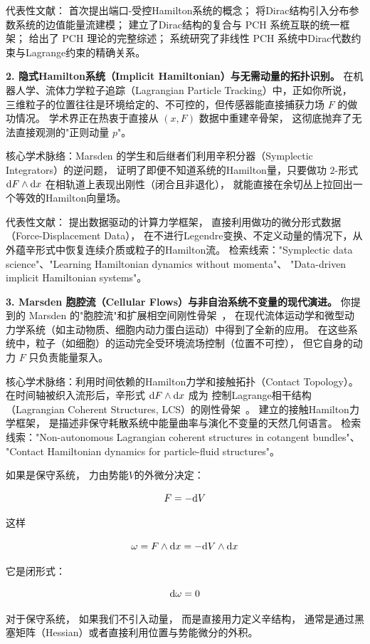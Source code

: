﻿\documentclass[10pt,a4paper]{article}
\begin{document}
\begin{framed}
代表性文献：\textcite{MaschkeVanDerSchaft1992} 首次提出端口-受控Hamilton系统的概念；
\textcite{VanDerSchaftMaschke2002} 将Dirac结构引入分布参数系统的边值能量流建模；
\textcite{CerveraVanDerSchaftBanos2007} 建立了Dirac结构的复合与 PCH 系统互联的统一框架；
\textcite{VanDerSchaftJeltsema2014} 给出了 PCH 理论的完整综述；
\textcite{VanDerSchaftMaschke2020} 系统研究了非线性 PCH 系统中Dirac代数约束与Lagrange约束的精确关系。

\textbf{2. 隐式Hamilton系统（Implicit Hamiltonian）与无需动量的拓扑识别。}
在机器人学、流体力学粒子追踪（Lagrangian Particle Tracking）中，正如你所说，
三维粒子的位置往往是环境给定的、不可控的，但传感器能直接捕获力场 $F$ 的做功情况。
学术界正在热衷于直接从 $(x, F)$ 数据中重建辛骨架，
这彻底抛弃了无法直接观测的"正则动量 $p$"。

核心学术脉络：Marsden 的学生和后继者们利用辛积分器（Symplectic Integrators）的逆问题，
证明了即便不知道系统的Hamilton量，只要做功 $2$-形式 $\text dF \wedge \text dx$ 在相轨道上表现出刚性（闭合且非退化），
就能直接在余切丛上拉回出一个等效的Hamilton向量场。

代表性文献：\textcite{KirchdoerferOrtiz2016} 提出数据驱动的计算力学框架，
直接利用做功的微分形式数据（Force-Displacement Data），
在不进行Legendre变换、不定义动量的情况下，从外蕴辛形式中恢复连续介质或粒子的Hamilton流。
检索线索："Symplectic data science"、"Learning Hamiltonian dynamics without momenta"、
"Data-driven implicit Hamiltonian systems"。

\textbf{3. Marsden 胞腔流（Cellular Flows）与非自治系统不变量的现代演进。}
你提到的 Marsden 的"胞腔流"和扩展相空间刚性骨架~\cite{MarsdenRatiu1994}，
在现代流体运动学和微型动力学系统（如主动物质、细胞内动力蛋白运动）中得到了全新的应用。
在这些系统中，粒子（如细胞）的运动完全受环境流场控制（位置不可控），
但它自身的动力 $F$ 只负责能量泵入。

核心学术脉络：利用时间依赖的Hamilton力学和接触拓扑（Contact Topology）。
在时间轴被织入流形后，辛形式 $\text dF \wedge \text dx$ 成为
控制Lagrange相干结构（Lagrangian Coherent Structures, LCS）的刚性骨架~\cite{Haller2015}。
\textcite{BravettiCruzTapias2017} 建立的接触Hamilton力学框架，
是描述非保守耗散系统中能量曲率与演化不变量的天然几何语言。
检索线索："Non-autonomous Lagrangian coherent structures in cotangent bundles"、
"Contact Hamiltonian dynamics for particle-fluid structures"。


\end{framed}



\begin{framed}
    
如果是保守系统，
力由势能$V$的外微分决定：

$$
F = - \text dV
$$

这样

$$
\omega = F \wedge \text dx = -\text dV \wedge \text dx
$$

它是闭形式：

$$
\text d\omega = 0
$$

对于保守系统，
如果我们不引入动量，
而是直接用力定义辛结构，
通常是通过黑塞矩阵（Hessian）或者直接利用位置与势能微分的外积。

\end{framed}
\end{document}
